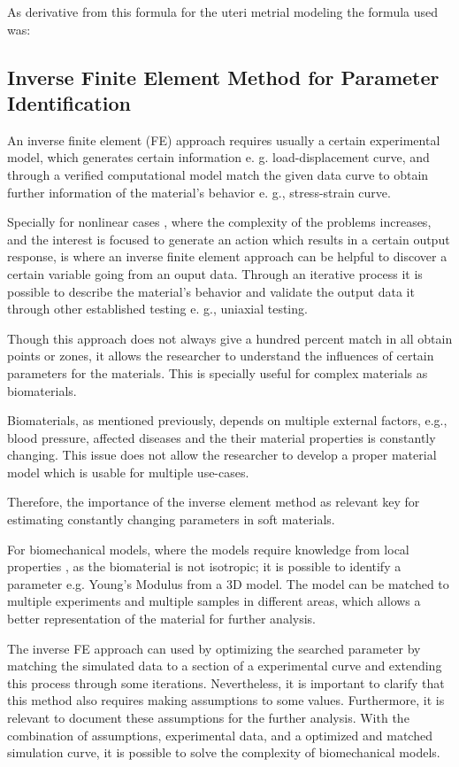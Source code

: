 As derivative from this formula for the uteri metrial modeling the formula used was:

\subsection{Inverse Finite Element Method for Parameter Identification}

An inverse finite element (FE) approach requires usually a certain experimental model,
 which generates certain information e. g. load-displacement curve, and through 
a verified computational model match the given data curve to obtain further information 
of the material's behavior e. g., stress-strain curve.

Specially for nonlinear cases \cite{Husain2004}, where the complexity of the problems 
increases, and the interest is focused to generate an action which results in a 
certain output response, is where an inverse finite element approach can be helpful 
to discover a certain variable going from an ouput data. Through an iterative process it is 
possible to describe the material's behavior and validate the output data it 
through other established testing e. g., uniaxial testing.

Though this approach does not always give a hundred percent match in all obtain points 
or zones, it allows the researcher to understand the influences of certain parameters 
for the materials. This is specially useful for complex materials as biomaterials. 

Biomaterials, as mentioned previously, depends on multiple external factors, e.g., blood 
pressure, affected diseases and the their material properties is constantly changing. 
This issue does not allow the researcher to develop a proper material model which is 
usable for multiple use-cases. 

Therefore, the importance of the inverse element method as relevant key for estimating 
constantly changing parameters in soft materials.

For biomechanical models, where the models require knowledge from local properties \cite{Chai2013},
as the biomaterial is not isotropic; it is possible to identify a parameter e.g. Young's Modulus 
from a 3D model. The model can be matched to multiple experiments and multiple samples in different areas,
which allows a better representation of the material for further analysis.

The inverse FE approach can used by optimizing the searched parameter by matching the simulated data
to a section of a experimental curve and extending this process through some iterations. 
Nevertheless, it is important to clarify that this method also requires making assumptions to some values.
Furthermore, it is relevant to document these assumptions for the further analysis. 
With the combination of assumptions, experimental data, and a optimized and matched simulation curve, it
is possible to solve the complexity of biomechanical models.
 
